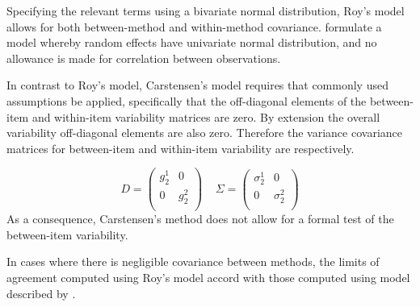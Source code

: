 \documentclass[12pt, a4paper]{report}
\theoremstyle{plain}
\theoremstyle{definition}
\theoremstyle{remark}
\begin{document}
	Specifying the relevant terms using a bivariate normal distribution, Roy's model allows for both between-method and within-method covariance. \citet{BXC2008} formulate a model whereby random effects have univariate normal distribution, and no allowance is made for correlation between observations.
	
	In contrast to Roy's model, Carstensen's model requires that commonly used assumptions be applied, specifically that the off-diagonal elements of the between-item and within-item variability matrices are zero. By
	extension the overall variability off-diagonal elements are also zero. Therefore the variance covariance matrices for
	between-item and within-item variability are respectively.
	
	\[{D} = \left(
	\begin{array}{cc}
	g^1_2  & 0 \\
	0 & g^2_2 \\
	\end{array}
	\right) \;\;\;\; {\Sigma} = \left(
	\begin{array}{cc}
	\sigma^1_2  & 0 \\
	0 & \sigma^2_2 \\
	\end{array}
	\right) \]
	As a consequence, Carstensen's method does not allow for a formal test of the between-item variability.
	
	
	
	
	
	
	
	
	
	
	In cases where there is negligible covariance between methods, the limits of agreement computed using Roy's model accord with those computed using model described by \citet{BXC2008}. 
	
\end{document}
